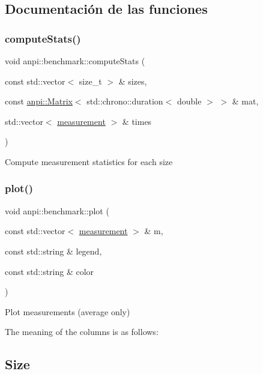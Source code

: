 \subsection{Documentación de las funciones}
\mbox{\label{namespaceanpi_1_1benchmark_a02a7668535c6dae4644ace1f7f6e2f75}} 
\subsubsection{\texorpdfstring{compute\+Stats()}{computeStats()}}
{\footnotesize\ttfamily void anpi\+::benchmark\+::compute\+Stats (\begin{DoxyParamCaption}\item[{const std\+::vector$<$ size\+\_\+t $>$ \&}]{sizes,  }\item[{const \hyperlink{classanpi_1_1Matrix}{anpi\+::\+Matrix}$<$ std\+::chrono\+::duration$<$ double $>$ $>$ \&}]{mat,  }\item[{std\+::vector$<$ \hyperlink{structanpi_1_1benchmark_1_1measurement}{measurement} $>$ \&}]{times }\end{DoxyParamCaption})}

Compute measurement statistics for each size \mbox{\label{namespaceanpi_1_1benchmark_a2342edf4630c65e3bb493d4327aaf2e5}} 
\subsubsection{\texorpdfstring{plot()}{plot()}}
{\footnotesize\ttfamily void anpi\+::benchmark\+::plot (\begin{DoxyParamCaption}\item[{const std\+::vector$<$ \hyperlink{structanpi_1_1benchmark_1_1measurement}{measurement} $>$ \&}]{m,  }\item[{const std\+::string \&}]{legend,  }\item[{const std\+::string \&}]{color }\end{DoxyParamCaption})}

Plot measurements (average only)

The meaning of the columns is as follows\+: \subsection*{Size}

